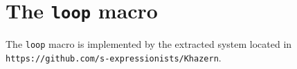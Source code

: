 \chapter{The \texttt{loop} macro} 

The \texttt{loop} macro is implemented by the extracted system
\khazern{} located in
\texttt{https://github.com/s-expressionists/Khazern}.
